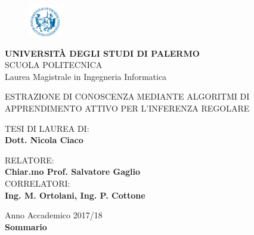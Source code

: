
\begin{center}
\begin{figure}[!h]
  	\centering
 	\includegraphics[width=1.5cm]{../pictures/frontespizio/logo_unipa_piccolo.png}
\end{figure}
\textsc{\textbf{UNIVERSIT\`A DEGLI STUDI DI PALERMO}} \\
SCUOLA POLITECNICA\\
\small{Laurea Magistrale in Ingegneria Informatica}\\
\end{center}
\begin{center}
\uppercase{Estrazione di conoscenza mediante algoritmi di apprendimento attivo per l'inferenza regolare}
\end{center}

\begin{minipage}[t]{0.65\textwidth}\raggedright
{ \scriptsize{TESI DI LAUREA DI:}\\
\scriptsize{\textbf{Dott. Nicola Ciaco}}
}
\end{minipage}
\begin{minipage}[t]{0.47\textwidth}\raggedright
{\scriptsize{RELATORE:}\\
\vspace{0.7mm}
\scriptsize{\textbf{Chiar.mo Prof. Salvatore Gaglio}}\\
\vspace{0.7mm}
\scriptsize{CORRELATORI:}\\
\vspace{0.7mm}
\scriptsize{\textbf{Ing. M. Ortolani, Ing. P. Cottone}}\\
}
\end{minipage}
\begin{center}
{\small Anno Accademico 2017/18 \\}%
\vspace{3mm}
\small{\textbf{Sommario}}\\
\end{center}


